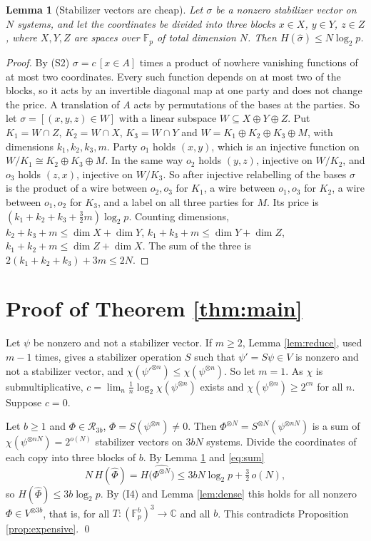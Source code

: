 \documentclass[11pt]{article}
\newtheorem{lemma}[theorem]{Lemma}
\theoremstyle{definition}
\newcommand{\C}{\mathbb C}
\newcommand{\F}{\mathbb F}
\begin{document}
\begin{lemma}[Stabilizer vectors are cheap]\label{lem:cheap}
Let $\sigma$ be a nonzero stabilizer vector on $N$ systems, and let the coordinates be divided into three blocks $x\in X$, $y\in Y$, $z\in Z$, where $X,Y,Z$ are spaces over $\F_p$ of total dimension $N$. Then $H(\hat\sigma)\le N\log_2p$.
\end{lemma}
\begin{proof}
By (S2) $\sigma=c\,[x\in A]$ times a product of nowhere vanishing functions of at most two coordinates. Every such function depends on at most two of the blocks, so it acts by an invertible diagonal map at one party and does not change the price. A translation of $A$ acts by permutations of the bases at the parties. So let $\sigma=[(x,y,z)\in W]$ with a linear subspace $W\subseteq X\oplus Y\oplus Z$.
Put $K_1=W\cap Z$, $K_2=W\cap X$, $K_3=W\cap Y$ and $W=K_1\oplus K_2\oplus K_3\oplus M$, with dimensions $k_1,k_2,k_3,m$. Party $o_1$ holds $(x,y)$, which is an injective function on $W/K_1\cong K_2\oplus K_3\oplus M$. In the same way $o_2$ holds $(y,z)$, injective on $W/K_2$, and $o_3$ holds $(z,x)$, injective on $W/K_3$.
So after injective relabelling of the bases $\hat\sigma$ is the product of a wire between $o_2,o_3$ for $K_1$, a wire between $o_1,o_3$ for $K_2$, a wire between $o_1,o_2$ for $K_3$, and a label on all three parties for $M$. Its price is $(k_1+k_2+k_3+\frac32m)\log_2p$. Counting dimensions, $k_2+k_3+m\le\dim X+\dim Y$, $k_1+k_3+m\le\dim Y+\dim Z$, $k_1+k_2+m\le\dim Z+\dim X$. The sum of the three is
$2(k_1+k_2+k_3)+3m\le2N$.
\end{proof}

\section{Proof of Theorem \ref{thm:main}}
Let $\psi$ be nonzero and not a stabilizer vector. If $m\ge2$, Lemma \ref{lem:reduce}, used $m-1$ times, gives a stabilizer operation $S$ such that $\psi'=S\psi\in V$ is nonzero and not a stabilizer vector, and $\chi(\psi'^{\otimes n})\le\chi(\psi^{\otimes n})$. So let $m=1$. As $\chi$ is submultiplicative, $c=\lim_n\frac1n\log_2\chi(\psi^{\otimes n})$ exists and $\chi(\psi^{\otimes n})\ge2^{cn}$ for all $n$. Suppose $c=0$.

Let $b\ge1$ and $\Phi\in\mathcal R_{3b}$, $\Phi=S(\psi^{\otimes n})\ne0$. Then $\Phi^{\otimes N}=S^{\otimes N}(\psi^{\otimes nN})$ is a sum of $\chi(\psi^{\otimes nN})=2^{o(N)}$ stabilizer vectors on $3bN$ systems. Divide the coordinates of each copy into three blocks of $b$. By Lemma \ref{lem:cheap} and \eqref{eq:sum}
\[
N\,H(\hat\Phi)=H\big(\widehat{\Phi^{\otimes N}}\big)\le3bN\log_2p+\tfrac32\,o(N),
\]
so $H(\hat\Phi)\le3b\log_2p$. By (I4) and Lemma \ref{lem:dense} this holds for all nonzero $\Phi\in V^{\otimes3b}$, that is, for all $T\colon(\F_p^b)^3\to\C$ and all $b$. This contradicts Proposition \ref{prop:expensive}. \qed
\end{document}
